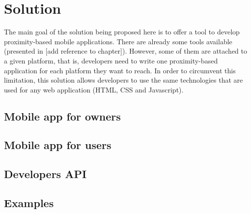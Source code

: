 
\chapter{Solution}
\label{chapter:solution}
The main goal of the solution being proposed here is to offer a tool
to develop proximity-based mobile applications.
There are already some tools available (presented in [add reference to chapter]).
However, some of them are attached to a given platform, that is, developers
need to write one proximity-based application for each platform they want
to reach.
In order to circumvent this limitation, this solution allows developers
to use the same technologies that are used for any web application (HTML, CSS
and Javascript).

\section{Mobile app for owners}
\label{sec:solution_mobile_app_for_owners}

\section{Mobile app for users}
\label{sec:solution_mobile_app_for_users}

\section{Developers API}
\label{sec:solution_developers_api}

\section{Examples}
\label{sec:solution_examples}
